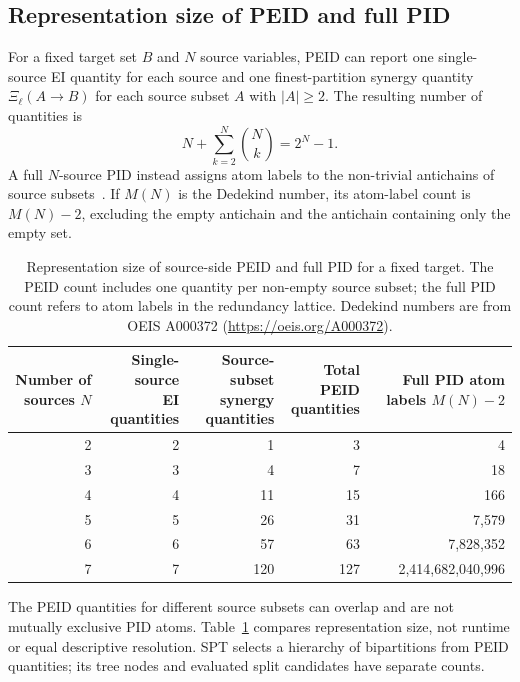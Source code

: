 \subsection{Representation size of PEID and full PID}
\label{app:peid_pid_representation}

For a fixed target set \(B\) and \(N\) source variables, PEID can report one single-source EI quantity for each source and one finest-partition synergy quantity \(\Xi_{\ell}(A\rightarrow B)\) for each source subset \(A\) with \(|A|\geq 2\). The resulting number of quantities is
\[
N+\sum_{k=2}^{N}\binom{N}{k}=2^{N}-1.
\]
A full \(N\)-source PID instead assigns atom labels to the non-trivial antichains of source subsets~\cite{Williams2010NonnegativeDO}. If \(M(N)\) is the Dedekind number, its atom-label count is \(M(N)-2\), excluding the empty antichain and the antichain containing only the empty set.

\begin{table}[htbp]
\centering
\footnotesize
\setlength{\tabcolsep}{4pt}
\begin{tabular}{r r r r r}
\hline
\shortstack{Number of\\sources \(N\)} &
\shortstack{Single-source\\EI quantities} &
\shortstack{Source-subset\\synergy quantities} &
\shortstack{Total PEID\\quantities} &
\shortstack{Full PID\\atom labels \(M(N)-2\)} \\
\hline
2 & 2 & 1 & 3 & 4 \\
3 & 3 & 4 & 7 & 18 \\
4 & 4 & 11 & 15 & 166 \\
5 & 5 & 26 & 31 & 7,579 \\
6 & 6 & 57 & 63 & 7,828,352 \\
7 & 7 & 120 & 127 & 2,414,682,040,996 \\
\hline
\end{tabular}
\caption{Representation size of source-side PEID and full PID for a fixed target. The PEID count includes one quantity per non-empty source subset; the full PID count refers to atom labels in the redundancy lattice. Dedekind numbers are from OEIS A000372 (\url{https://oeis.org/A000372}).}
\label{tab:peid_pid_representation}
\end{table}

The PEID quantities for different source subsets can overlap and are not mutually exclusive PID atoms. Table~\ref{tab:peid_pid_representation} compares representation size, not runtime or equal descriptive resolution. SPT selects a hierarchy of bipartitions from PEID quantities; its tree nodes and evaluated split candidates have separate counts.

